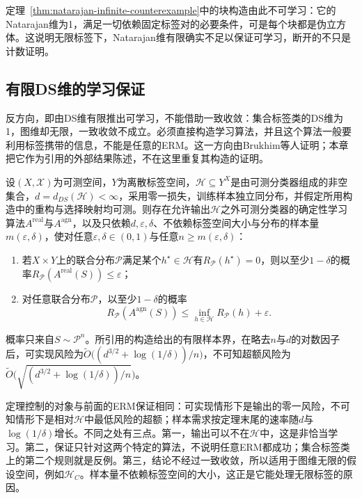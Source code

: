 定理~\ref{thm:natarajan-infinite-counterexample}中的块构造由此不可学习：它的Natarajan维为1，满足一切依赖固定标签对的必要条件，可是每个块都是伪立方体。这说明无限标签下，Natarajan维有限确实不足以保证可学习，断开的不只是计数证明。

\subsection{有限DS维的学习保证}
\label{sec:lt6-finite-ds}

反方向，即由DS维有限推出可学习，不能借助一致收敛：集合标签类的DS维为1，图维却无限，一致收敛不成立。必须直接构造学习算法，并且这个算法一般要利用标签携带的信息，不能是任意的ERM。这一方向由Brukhim等人证明；本章把它作为引用的外部结果陈述，不在这里重复其构造的证明。

\begin{theorem}[有限DS维的学习保证]
\label{thm:finite-ds-learnability}
设$(X,\mathcal X)$为可测空间，$Y$为离散标签空间，$\mathcal H\subseteq Y^X$是由可测分类器组成的非空集合，$d=d_{DS}(\mathcal H)<\infty$，采用零一损失，训练样本独立同分布，并假定所用构造中的重构与选择映射均可测。则存在允许输出$\mathcal H$之外可测分类器的确定性学习算法$A^{\mathrm{real}}$与$A^{\mathrm{agn}}$，以及只依赖$d,\varepsilon,\delta$、不依赖标签空间大小与分布的样本量$m(\varepsilon,\delta)$，使对任意$\varepsilon,\delta\in(0,1)$与任意$n\geq m(\varepsilon,\delta)$：
\begin{enumerate}
 \item 若$X\times Y$上的联合分布$\mathcal P$满足某个$h^\star\in\mathcal H$有$R_{\mathcal P}(h^\star)=0$，则以至少$1-\delta$的概率$R_{\mathcal P}(A^{\mathrm{real}}(S))\leq\varepsilon$；
 \item 对任意联合分布$\mathcal P$，以至少$1-\delta$的概率
 \[
  R_{\mathcal P}(A^{\mathrm{agn}}(S))\leq\inf_{h\in\mathcal H}R_{\mathcal P}(h)+\varepsilon.
 \]
\end{enumerate}
概率只来自$S\sim\mathcal P^n$。所引用的构造给出的有限样本界，在略去$n$与$d$的对数因子后，可实现风险为$\widetilde O\bigl((d^{3/2}+\log(1/\delta))/n\bigr)$，不可知超额风险为$\widetilde O\bigl(\sqrt{(d^{3/2}+\log(1/\delta))/n}\bigr)$。
\end{theorem}

定理控制的对象与前面的ERM保证相同：可实现情形下是输出的零一风险，不可知情形下是相对$\mathcal H$中最低风险的超额；样本需求按定理末尾的速率随$d$与$\log(1/\delta)$增长。不同之处有三点。第一，输出可以不在$\mathcal H$中，这是非恰当学习。第二，保证只针对这两个特定的算法，不说明任意ERM都成功；集合标签类上的第二个规则就是反例。第三，结论不经过一致收敛，所以适用于图维无限的假设空间，例如$\mathcal H_C$。样本量不依赖标签空间的大小，这正是它能处理无限标签的原因。

